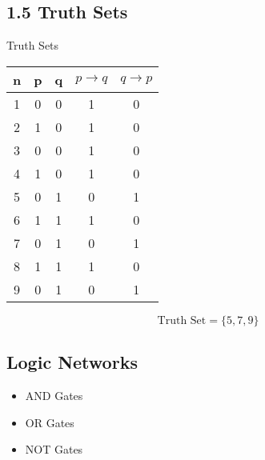 
\subsection*{1.5 Truth Sets}

{Truth Sets}

\begin{center}
\begin{tabular}{|c||c|c||c||c|}
\hline \phantom{sp} n \phantom{sp} & \phantom{sp} p \phantom{sp} & \phantom{sp}q \phantom{sp}& \phantom{s} $  p \rightarrow q$ \phantom{s}& \phantom{s} $q \rightarrow p$ \phantom{s}\\  \hline
\hline 1 & 0 & 0 & 1 & 0\\ 
\hline 2 & 1 & 0 & 1 & 0\\ 
\hline 3 & 0 & 0 & 1 & 0\\ 
\hline 4 & 1 & 0 & 1 & 0\\ 
\hline 5 & 0 & 1 & 0 & 1\\ 
\hline 6 & 1 & 1 & 1 & 0\\ 
\hline 7 & 0 & 1 & 0 & 1\\ 
\hline 8 & 1 & 1 & 1 & 0\\ 
\hline 9 & 0 & 1 & 0 & 1\\ 
\hline 
\end{tabular} 
\end{center}
\[\mbox{Truth Set} = \{5,7,9\}\]






\newpage

\subsection*{Logic Networks}
\begin{itemize}
\item AND Gates
\item OR Gates
\item NOT Gates
\end{itemize}

